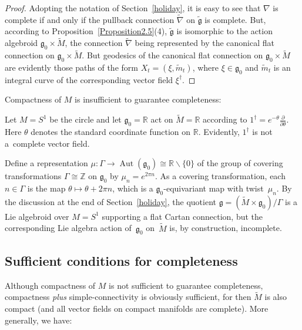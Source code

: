 \documentclass[pdftex]{sigma}
\DeclareMathOperator{\automorphism}{Aut}
\numberwithin{equation}{section}
\begin{document}
\begin{proof}
  Adopting the notation of Section~\ref{holiday}, it is easy to see that
  $\nabla $ is complete if and only if the pullback connection $\tilde
  \nabla $ on $\tilde {\mathfrak g} $ is complete. But, according to
  Proposition~\ref{Proposition2.5}(4),
  $\tilde {\mathfrak g} $ is
  isomorphic to the action algebroid ${\mathfrak g}_0 \times \tilde
  M$, the connection $\tilde \nabla $ being represented by the
  canonical f\/lat connection on ${\mathfrak g}_0 \times \tilde M$. But
  geodesics of the canonical f\/lat connection on ${\mathfrak g}_0
  \times \tilde M$ are evidently those paths of the form
  $X_t=(\xi,\tilde m_t)$, where $\xi \in {\mathfrak g}_0 $ and $\tilde
  m_t$ is an integral curve of the corresponding vector f\/ield
  $\xi^\dagger$.
\end{proof}

Compactness of $M$ is insuf\/f\/icient to guarantee completeness:
\begin{CounterexampleBlaom}
  Let $M=S^1$ be the circle and let ${\mathfrak g}_0={\mathbb R}$ act
  on $\tilde M= {\mathbb R} $ according to
  $1^\dagger=e^{-\theta}\frac{\partial }{\partial \theta}$. Here
  $\theta$ denotes the standard coordinate function on ${\mathbb
    R}$. Evidently, $1^\dagger$ is not a~complete vector f\/ield.

  Def\/ine a representation $\mu \colon \Gamma \rightarrow
  \automorphism({\mathfrak g}_0)\cong {\mathbb R}\backslash \{0\}$ of
  the group of covering transformations $\Gamma\cong {\mathbb Z}$ on
  ${\mathfrak g}_0$ by $\mu_n = e^{2\pi n}$.  As a covering
  transformation, each $n \in \Gamma$ is the map $\theta \mapsto
  \theta + 2 \pi n$, which is a ${\mathfrak g}_0$-equivariant map with
  twist~$\mu_n$. By the discussion at the end of Section~\ref{holiday}, the
  quotient ${\mathfrak g} = (\tilde M \times {\mathfrak g}_0)/\Gamma$
  is a Lie algebroid over $M=S^1$ supporting a f\/lat Cartan connection,
  but the corresponding Lie algebra action of~${\mathfrak g}_0$ on~$\tilde M$ is, by construction, incomplete.
\end{CounterexampleBlaom}

\subsection{Suf\/f\/icient conditions for completeness}\label{suff}
Although compactness of $M$ is not suf\/f\/icient to guarantee
completeness, compactness {\em plus} simple-connectivity is obviously
suf\/f\/icient, for then $\tilde M$ is also compact (and all vector f\/ields
on compact manifolds are complete). More generally, we have:
\end{document}
